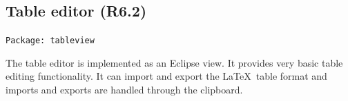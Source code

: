 \documentclass[a4paper,11pt,twoside]{article}
\begin{document}
\subsection{Table editor (R6.2)}

\texttt{Package: tableview}

The table editor is implemented as an Eclipse view. It provides very basic table
editing functionality. It can import and export the \LaTeX\ table format and
imports and exports are handled through the clipboard.


% 
% 
% 
% 
% 
%     
\end{document}
